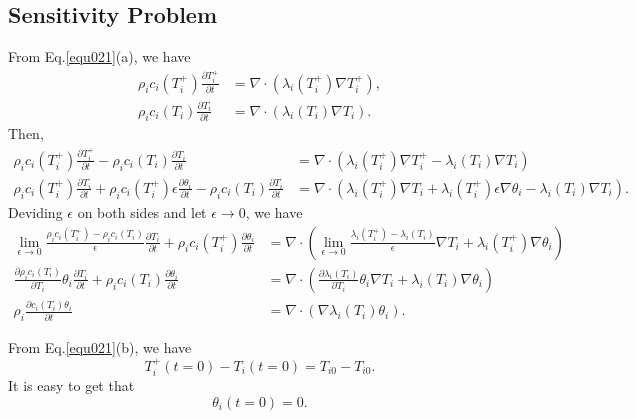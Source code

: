\documentclass[UTF-8]{article}
\begin{document}
\subsection{Sensitivity Problem}
From Eq.\ref{equ021}(a), we have
\begin{align*}
	\rho_i c_i(T_i^+) \frac{\partial T_i^+}{\partial t} &= \nabla \cdot \left( \lambda_i(T_i^+) \nabla T_i^+ \right),\\
	\rho_i c_i(T_i) \frac{\partial T_i}{\partial t} &= \nabla \cdot \left( \lambda_i(T_i) \nabla T_i \right).
\end{align*}
Then,
\begin{align*}
	\rho_i c_i(T_i^+) \frac{\partial T_i^+}{\partial t} - \rho_i c_i(T_i) \frac{\partial T_i}{\partial t} &= \nabla \cdot \left( \lambda_i(T_i^+) \nabla T_i^+ - \lambda_i(T_i) \nabla T_i \right) \\
	\rho_i c_i(T_i^+) \frac{\partial T_i}{\partial t} + \rho_i c_i(T_i^+) \epsilon \frac{\partial \theta_i}{\partial t} - \rho_i c_i(T_i) \frac{\partial T_i}{\partial t} &= \nabla \cdot \left( \lambda_i(T_i^+) \nabla T_i + \lambda_i(T_i^+) \epsilon \nabla \theta_i - \lambda_i(T_i) \nabla T_i \right).
\end{align*}
Deviding $\epsilon$ on both sides and let $\epsilon \to 0$, we have
\begin{align}\label{equ024}
	\lim_{\epsilon \to 0}\frac{\rho_ic_i(T_i^+) - \rho_ic_i(T_i)}{\epsilon} \frac{\partial T_i}{\partial t} + \rho_i c_i(T_i^+) \frac{\partial \theta_i}{\partial t} &= \nabla \cdot \left( \lim_{\epsilon \to 0}\frac{\lambda_i(T^+_i) - \lambda_i(T_i)}{\epsilon} \nabla T_i + \lambda_i(T_i^+)\nabla\theta_i \right) \nonumber \\
	\frac{\partial \rho_i c_i(T_i)}{\partial T_i} \theta_i \frac{\partial T_i}{\partial t} + \rho_i c_i(T_i)\frac{\partial \theta_i}{\partial t} &= \nabla\cdot\left( \frac{\partial \lambda_i(T_i)}{\partial T_i} \theta_i \nabla T_i + \lambda_i(T_i) \nabla \theta_i \right) \nonumber \\
	\rho_i \frac{\partial c_i(T_i)\theta_i}{\partial t} &= \nabla \cdot \left( \nabla \lambda_i(T_i) \theta_i \right).
\end{align}

From Eq.\ref{equ021}(b), we have
\begin{equation*}
	T_i^+(t = 0) - T_i(t = 0) = T_{i0} - T_{i0}.
\end{equation*}
It is easy to get that
\begin{equation}\label{equ025}
	\theta_i(t = 0) = 0.
\end{equation}
\end{document}
